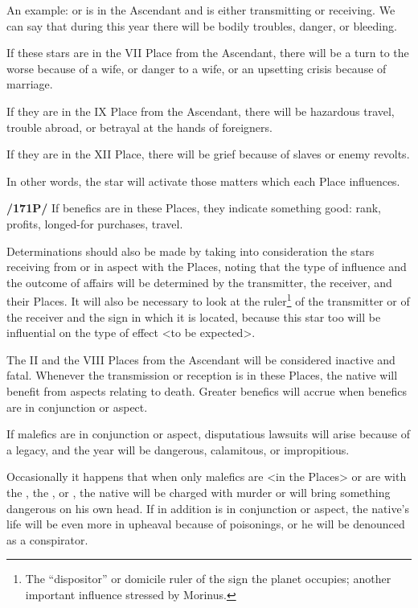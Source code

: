 An example: \Saturn\xspace or \Mars\xspace is in the Ascendant and is either transmitting or receiving. We can say that during this year there will be bodily troubles, danger, or bleeding. 

If these stars are in the VII Place from the Ascendant, there will be a turn to the worse because of a wife, or danger to a wife, or an upsetting crisis because of marriage. 

If they are in the IX Place from the Ascendant, there will be hazardous travel, trouble abroad, or betrayal at the hands of foreigners. 

If they are in the XII Place, there will be grief because
of slaves or enemy revolts. 

In other words, the star will activate those matters which each Place influences.

\textbf{/171P/} If benefics are in these Places, they indicate something good: rank, profits, longed-for purchases, travel.

Determinations should also be made by taking into consideration the stars receiving from or in aspect with the Places, noting that the type of influence and the outcome of affairs will be determined by the transmitter, the receiver, and their Places.
It will also be necessary to look at the ruler\footnote{The ``dispositor'' or domicile ruler of the sign the planet occupies; another important influence stressed by Morinus.} of the transmitter or of the receiver and the sign in which it is located, because this star too will be influential on the type of effect <to be expected>. 

 
The II and the VIII Places from the Ascendant will be considered inactive and fatal. Whenever the transmission or
reception is in these Places, the native will benefit from aspects relating to death. Greater benefics will accrue when benefics are in conjunction or aspect. 

If malefics are in conjunction or aspect, disputatious lawsuits will arise because of a legacy, and the year will be dangerous, calamitous, or impropitious.

Occasionally it happens that when only malefics are <in the Places> or are with the \Sun, the \Moon, or \Mercury, the native will be charged with murder or will bring something dangerous on his own head. If in addition \Venus\xspace is in conjunction or aspect, the native’s life will be even more in upheaval because of poisonings, or he will be denounced as a conspirator. 

